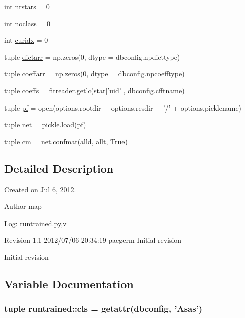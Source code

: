 \begin{DoxyCompactItemize}
\item 
int \hyperlink{namespaceruntrained_a5aa5eb79d3fc0906fd344c0b3537bdc6}{nrstars} = 0
\item 
int \hyperlink{namespaceruntrained_ae20d562b30bfd0ee3392b557c477b792}{noclass} = 0
\item 
int \hyperlink{namespaceruntrained_ab5617d20b9cf0b904a46b74e9584f3c9}{curidx} = 0
\item 
tuple \hyperlink{namespaceruntrained_ab856260e49d1dca1bbdabe16218f90bb}{dictarr} = np.zeros(0, dtype = dbconfig.npdicttype)
\item 
tuple \hyperlink{namespaceruntrained_a52fa48450cb7cb0673f11611f1d49ca8}{coeffarr} = np.zeros(0, dtype = dbconfig.npcoefftype)
\item 
tuple \hyperlink{namespaceruntrained_a59a01d66886c51ec3cba425426d38f62}{coeffs} = fitreader.getlc(star\mbox{[}'uid'\mbox{]}, dbconfig.cfftname)
\item 
tuple \hyperlink{namespaceruntrained_a2ff49f98ec84b551c2023c8e83115825}{pf} = open(options.rootdir + options.resdir + '/' + options.picklename)
\item 
tuple \hyperlink{namespaceruntrained_a5c8cf741c34dad8832215a3523e21ee1}{net} = pickle.load(\hyperlink{namespaceruntrained_a2ff49f98ec84b551c2023c8e83115825}{pf})
\item 
tuple \hyperlink{namespaceruntrained_ae78e84f04d590cfe2564b1a02853e08c}{cm} = net.confmat(alld, allt, True)
\end{DoxyCompactItemize}


\subsection{Detailed Description}
Created on Jul 6, 2012. \begin{DoxyAuthor}{Author}
map 
\end{DoxyAuthor}
\begin{DoxyParagraph}{Log:}
\hyperlink{runtrained_8py}{runtrained.py},v 
\end{DoxyParagraph}
Revision 1.1 2012/07/06 20:34:19 paegerm Initial revision

Initial revision 

\subsection{Variable Documentation}
\hypertarget{namespaceruntrained_a0781c6ec0fc8913052bfd0a74cdc84a0}{
\subsubsection[{cls}]{\setlength{\rightskip}{0pt plus 5cm}tuple {\bf runtrained::cls} = getattr({\bf dbconfig}, 'Asas')}}
\label{namespaceruntrained_a0781c6ec0fc8913052bfd0a74cdc84a0}


